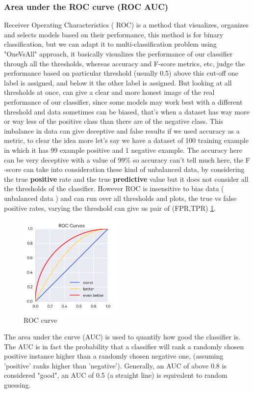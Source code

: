 \subsubsection{Area under the ROC curve (ROC AUC)}
Receiver Operating Characteristics  ( ROC) is a method that visualizes, organizes and selects models based on  their performance,  this method is for binary classification, but we can adapt it to multi-classification problem  using "OneVsAll" approach, it basically  visualizes the performance of our classifier through all the thresholds, whereas accuracy and F-score  metrics, etc, judge the performance based on particular threshold (usually  0.5) above this cut-off one label is assigned, and below it the other label is assigned. But  looking at all thresholds at once, can give a clear and more honest image of the real performance of our classifier,  since  some models may work best with a different threshold and data sometimes can be biased,   that's when  a dataset has way more or way less of the positive class than there are of the negative class. This imbalance in data can give deceptive and false results if we used accuracy as a metric, to clear the idea more let's say we have a dataset of 100 training example in which it  has 99 example positive and 1 negative example.  The accuracy here can be very deceptive with a value of 99\% so accuracy can't tell much here, the F$\textbf{-}$score can take  into consideration these kind of unbalanced data,  by considering  the true \textbf{positive } rate and the true \textbf{predictive} value  but  it does  not consider all the thresholds of the classifier. However  ROC  is insensitive to bias data ( unbalanced data ) and can run over all thresholds and plots, the  true vs false positive rates, varying the threshold can give us pair of (FPR,TPR) \ref{fig:bias2}.
\begin{figure}[H]
\centering
\includegraphics[width=0.45\textwidth]{img/roc.jpg}
\caption{ ROC curve }
\label{fig:bias2}
\end{figure}
The area under the curve (AUC) is used to quantify how good the classifier is. The AUC is in fact  the probability that a classifier will rank a randomly chosen positive instance higher than a randomly chosen negative one, (assuming 'positive' ranks higher than 'negative'). Generally, an AUC of above 0.8 is considered "good", an AUC of 0.5 (a straight line) is equivalent to random guessing.


